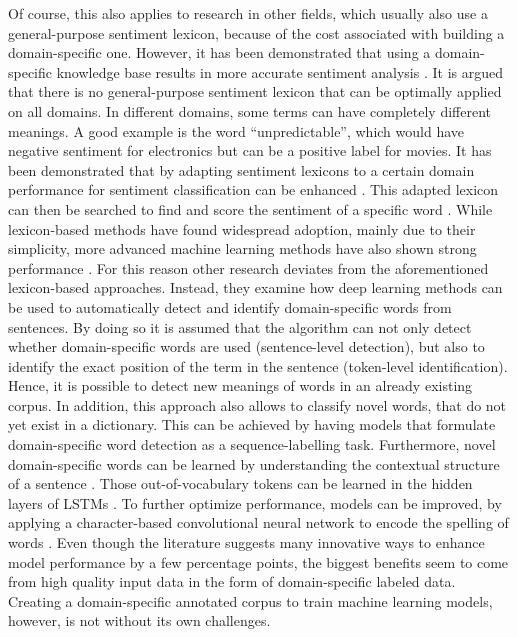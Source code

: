 \documentclass[11pt, a4paper]{article}
\begin{document}
Of course, this also applies to research in other fields, which usually also use a general-purpose sentiment lexicon, 
because of the cost associated with building a domain-specific one. However, it has been demonstrated that using a domain-specific 
knowledge base results in more accurate sentiment analysis \citep{park2015EfficientExtraction}.
It is argued that there is no general-purpose sentiment lexicon that can be optimally applied on all domains. 
In different domains, some terms can have completely different meanings. A good example is the word “unpredictable”, 
which would have negative sentiment for electronics but can be a positive label for movies. It has been demonstrated 
that by adapting sentiment lexicons to a certain domain performance for sentiment classification can be enhanced 
\citep{Lu2011automaticconstruction}. This adapted lexicon can then be searched to find and score the sentiment 
of a specific word \citep{ashgar2014DetectionSlang}. 
While lexicon-based methods have found widespread adoption, mainly due to their simplicity, more advanced machine 
learning methods have also shown strong performance \citep{wang2020automaticconstructiondomainsentiment}. For this reason other research 
deviates from the aforementioned lexicon-based approaches. Instead, they examine how deep learning methods can be 
used to automatically detect and identify domain-specific words from sentences. By doing so it is assumed that the 
algorithm can not only detect whether domain-specific words are used (sentence-level detection), but also to identify 
the exact position of the term in the sentence (token-level identification). Hence, it is possible to detect new meanings 
of words in an already existing corpus. In addition, this approach also allows to classify novel words, that do not yet 
exist in a dictionary. This can be achieved by having models that formulate domain-specific word detection as a 
sequence-labelling task. Furthermore, novel domain-specific words can be learned by understanding the contextual 
structure of a sentence \citep{pei2019slang}. Those out-of-vocabulary tokens can be learned in the hidden layers of 
LSTMs \citep{hochreiter1997lstm}. To further optimize performance, models can be improved, by applying a character-based 
convolutional neural network to encode the spelling of words \citep{pei2019slang}. Even though the literature suggests many 
innovative ways to enhance model performance by a few percentage points, the biggest benefits seem to come from high quality 
input data in the form of domain-specific labeled data.
Creating a domain-specific annotated corpus to train machine learning models, however, is not without its own challenges. 
\end{document}
